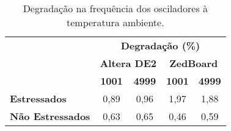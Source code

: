 \begin{table}[H]
\centering
\caption{Degradação na frequência dos osciladores à temperatura ambiente.}
\begin{tabular}{c|cccc|}
\cline{2-5}
 & \multicolumn{4}{c|}{\textbf{Degradação (\%)}} \\ \cline{2-5} 
 & \multicolumn{2}{c|}{\textbf{Altera DE2}} & \multicolumn{2}{c|}{\textbf{ZedBoard}} \\ \cline{2-5} 
 & \multicolumn{1}{c|}{\textbf{1001}} & \multicolumn{1}{c|}{\textbf{4999}} & \multicolumn{1}{c|}{\textbf{1001}} & \textbf{4999} \\ \hline
\multicolumn{1}{|l|}{\textbf{Estressados}} & \multicolumn{1}{c|}{0,89} & \multicolumn{1}{c|}{0,96} & \multicolumn{1}{c|}{1,97} & 1,88 \\ \hline
\multicolumn{1}{|l|}{\textbf{Não Estressados}} & \multicolumn{1}{c|}{0,63} & \multicolumn{1}{c|}{0,65} & \multicolumn{1}{c|}{0,46} & 0,59 \\ \hline
\end{tabular}
\label{tab:DegradFinaisTAmb}
\end{table}